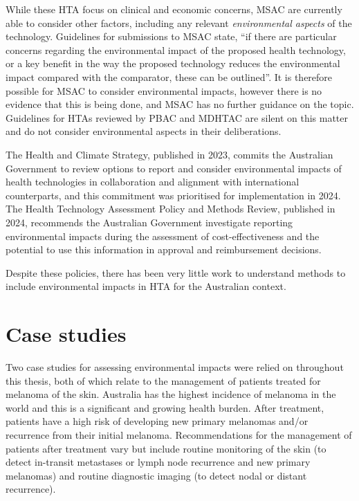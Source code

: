 \begin{refsection}
While these HTA focus on clinical and economic concerns, MSAC are currently able to consider other factors, including any relevant \textit{environmental aspects} of the technology.\cite{australian_government_department_of_health_disability_and_ageing_guidelines_2021} Guidelines for submissions to MSAC state, “if there are particular concerns regarding the environmental impact of the proposed health technology, or a key benefit in the way the proposed technology reduces the environmental impact compared with the comparator, these can be outlined”.\cite{australian_government_department_of_health_disability_and_ageing_guidelines_2021} It is therefore possible for MSAC to consider environmental impacts, however there is no evidence that this is being done, and MSAC has no further guidance on the topic. Guidelines for HTAs reviewed by PBAC and MDHTAC are silent on this matter and do not consider environmental aspects in their deliberations.\cite{australian_government_department_of_health_disability_and_ageing_guidelines_2016}

The Health and Climate Strategy, published in 2023, commits the Australian Government to review options to report and consider environmental impacts of health technologies in collaboration and alignment with international counterparts,\cite{australian_government_department_of_health_disability_and_ageing_national_2023} and this commitment was prioritised for implementation in 2024.\cite{australian_government_department_of_health_disability_and_ageing_national_2024} The Health Technology Assessment Policy and Methods Review, published in 2024, recommends the Australian Government investigate reporting environmental impacts during the assessment of cost-effectiveness and the potential to use this information in approval and reimbursement decisions.\cite{australian_government_department_of_health_and_aged_care_health_2024}

Despite these policies, there has been very little work to understand methods to include environmental impacts in HTA for the Australian context. 

\section{Case studies}
Two case studies for assessing environmental impacts were relied on throughout this thesis, both of which relate to the management of patients treated for melanoma of the skin. Australia has the highest incidence of melanoma in the world and this is a significant and growing health burden. After treatment, patients have a high risk of developing new primary melanomas and/or recurrence from their initial melanoma. Recommendations for the management of patients after treatment vary but include routine monitoring of the skin (to detect in-transit metastases or lymph node recurrence and new primary melanomas) and routine diagnostic imaging (to detect nodal or distant recurrence). 


\end{refsection}
